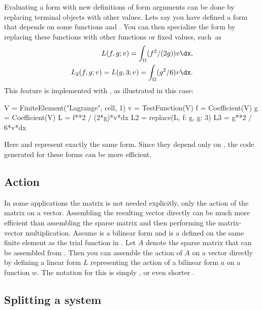 Evaluating a form with new definitions of form arguments can be done
by replacing terminal objects with other values.  Lets say you have
defined a form  that depends on some functions  and .
You can then specialize the form by replacing these functions with other
functions or fixed values, such~as
\begin{align}
L(f, g; v) = \int_\Omega (f^2 / (2g)) v \dx, \\
{L}_2(f, g; v) = L(g, 3; v) = \int_\Omega (g^2 / 6) v \dx.
\end{align}
This feature is implemented with , as illustrated in
this case:
\begin{uflcode}
V = FiniteElement("Lagrange", cell, 1)
v = TestFunction(V)
f = Coefficient(V)
g = Coefficient(V)
L = f**2 / (2*g)*v*dx
L2 = replace(L, { f: g, g: 3})
L3 = g**2 / 6*v*dx
\end{uflcode}
Here  and  represent exactly the same form. Since they
depend only on , the code generated for these forms can be more
efficient.

\subsection{Action}
\label{ufl:sec:action}

In some applications the matrix is not needed explicitly, only the action
of the matrix on a vector. Assembling the resulting vector directly can be
much more efficient than assembling the sparse matrix and then performing
the matrix-vector multiplication.  Assume  is a bilinear form and
 is a  defined on the same finite element as
the trial function in .  Let $A$ denote the sparse matrix that
can be assembled from . Then you can assemble the action of $A$
on a vector directly by defining a linear form $L$ representing the
action of a bilinear form $a$ on a function $w$.  The notation for this
is simply , or even shorter .
\subsection{Splitting a system}
\label{ufl:sec:system}

